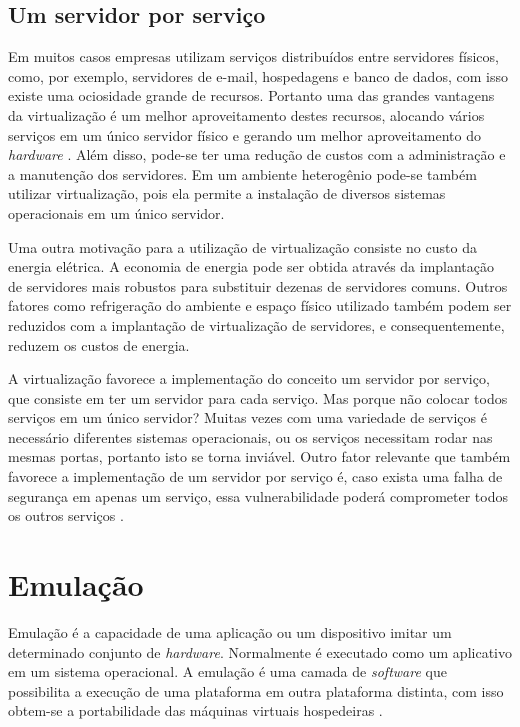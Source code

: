 \subsection{Um servidor por serviço}
\label{section:virtserv}

Em muitos casos empresas utilizam serviços distribuídos entre servidores físicos, como, por exemplo, servidores de e-mail, hospedagens e 
banco de dados, com isso existe uma ociosidade grande de recursos. Portanto uma das grandes vantagens da virtualização é um melhor 
aproveitamento destes recursos, alocando vários serviços em um único servidor físico e gerando um melhor aproveitamento do \textit{hardware} 
\cite{moreira2006}. Além disso, pode-se ter uma redução de custos com a administração e a manutenção dos servidores. Em um ambiente 
heterogênio pode-se também utilizar virtualização, pois ela permite a instalação de diversos sistemas operacionais em um único servidor.

Uma outra motivação para a utilização de virtualização consiste no custo da energia elétrica. A economia de energia pode ser obtida através 
da implantação de servidores mais robustos para substituir dezenas de servidores comuns. Outros fatores como refrigeração do ambiente e 
espaço físico utilizado também podem ser reduzidos com a implantação de virtualização de servidores, e consequentemente, reduzem os 
custos de energia.

A virtualização favorece a implementação do conceito um servidor por serviço, que consiste em ter um servidor para cada serviço.
Mas porque não colocar todos serviços em um único servidor? Muitas vezes com uma variedade de serviços é necessário diferentes 
sistemas operacionais, ou os serviços necessitam rodar nas mesmas portas, portanto isto se torna inviável. Outro fator relevante que 
também favorece a implementação de um servidor por serviço é, caso exista uma falha de segurança em apenas um serviço, essa 
vulnerabilidade poderá comprometer todos os outros serviços \cite{carissimi2008}.

\section{Emulação}

Emulação é a capacidade de uma aplicação ou um dispositivo imitar um determinado conjunto de \textit{hardware}. Normalmente é
executado como um aplicativo em um sistema operacional. A emulação é uma camada de \textit{software} que possibilita a execução
de uma plataforma em outra plataforma distinta, com isso obtem-se a portabilidade das máquinas virtuais hospedeiras \cite{silva2009}.

